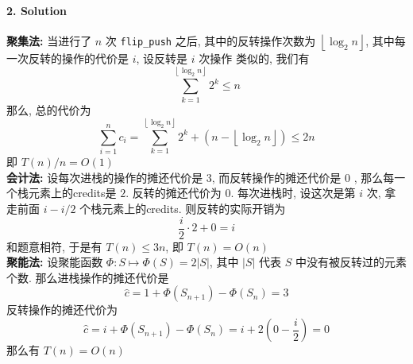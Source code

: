 \documentclass[a4paper, 10pt]{ctexart} %
\begin{document}
\paragraph{2. Solution} %
\label{par:}
\textbf{聚集法: }
当进行了 $n$ 次 \verb|flip_push| 之后, 其中的反转操作次数为 $\left\lfloor \log _{2  } n \right\rfloor$, 其中每一次反转的操作的代价是 $i$, 设反转是 $i$ 次操作
类似的, 我们有
\[
\sum_{k=1} ^{\left\lfloor  \log _{2} n  \right\rfloor}  2 ^{k} \le   n
\]
那么, 总的代价为 
\[
\sum_{i=1}^{n} c_{i} = \sum_{k=1}  ^{\left\lfloor  \log _{2}n \right\rfloor} 2 ^{k} +  \left(n -  \left\lfloor  \log _{2} n \right\rfloor\right) \le 2n
\]
即 $T\left(n\right) /n  = O\left(1\right)$
\\ [7pt]
\textbf{会计法: }
设每次进栈的操作的摊还代价是 $3$, 而反转操作的摊还代价是 $0$ , 那么每一个栈元素上的credits是 $2$. 
反转的摊还代价为 $0$. 每次进栈时, 设这次是第 $i$ 次, 拿走前面 $i -  i / 2$ 个栈元素上的credits. 则反转的实际开销为 
$$ \frac{i}{2} \cdot 2 + 0 = i$$
和题意相符, 于是有 $T\left(n\right) \le 3n$, 即 $T\left(n\right) = O\left(n\right)$
\\ [7pt]
\textbf{聚能法: }
设聚能函数 $\varPhi: S \mapsto \varPhi ( S  ) = 2 \left| S \right| $, 其中 $\left| S \right| $ 代表 $S$ 中没有被反转过的元素个数. 
那么进栈操作的摊还代价是 
\[
\hat{c} = 1 + \varPhi (S_{n+1}) - \varPhi\left(S_{n}\right) = 3
\]
反转操作的摊还代价为 
\[
\hat{c} = i + \varPhi (S_{n+1}) - \varPhi \left(S_{n}\right)  = i + 2 \left(  0  - \frac{i}{2}\right)  = 0
\]
那么有 $T\left(n\right) = O\left(n\right)$
\end{document}
